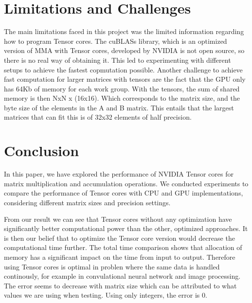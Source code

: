 \documentclass[conference]{IEEEtran}
\begin{document}
  \section{Limitations and Challenges}\label{sec:limitations-challenges}
  The main limitations faced in this project was the limited information regarding how to program Tensor cores.
  The cuBLASs library, which is an optimized version of MMA with Tensor cores, developed by NVIDIA is not open source,
  so there is no real way of obtaining it. This led to experimenting with different setups to achieve the fastest copmutation possible.
  Another challenge to achieve fast computation for larger matrices with tensors are the fact that the GPU 
  only has 64Kb of memory for each work group. With the tensors, the sum of shared memory is then NxN x (16x16).
  Which corresponds to the matrix size, and the byte size of the elements in the A and B matrix. This entails that the 
  largest matrices that can fit this is of 32x32 elements of half precision.


  \section{Conclusion}\label{sec:conclusion}
  
  In this paper, we have explored the performance of NVIDIA Tensor cores for matrix multiplication and accumulation operations. 
  We conducted experiments to compare the performance of Tensor cores with CPU and GPU implementations, 
  considering different matrix sizes and precision settings.

  From our result we can see that Tensor cores without any optimization have significantly better computational power
  than the other, optimized approaches. It is then our belief that to optimize the Tensor core version would 
  decrease the computational time further. The total time comparison shows that allocation of memory has a significant
  impact on the time from input to output. Therefore using Tensor cores is optimal in problen where the same data is
  handled continously, for example in convulational neural network and image processing. The error seems to decrease
  with matrix size which can be attributed to what values we are using when testing. Using only integers, the error is 0.

  



\end{document}
